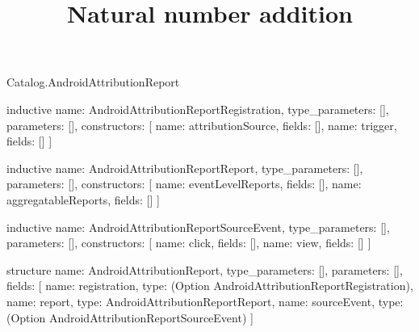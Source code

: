 \begin{lexlean}{Catalog.AndroidAttributionReport}
\title{Natural number addition}
\begin{semanticmodule}
inductive{
  name: AndroidAttributionReportRegistration,
  type_parameters: [],
  parameters: [],
  constructors: [
    {name: attributionSource, fields: []},
    {name: trigger, fields: []}
  ]
}

inductive{
  name: AndroidAttributionReportReport,
  type_parameters: [],
  parameters: [],
  constructors: [
    {name: eventLevelReports, fields: []},
    {name: aggregatableReports, fields: []}
  ]
}

inductive{
  name: AndroidAttributionReportSourceEvent,
  type_parameters: [],
  parameters: [],
  constructors: [
    {name: click, fields: []},
    {name: view, fields: []}
  ]
}

structure{
  name: AndroidAttributionReport,
  type_parameters: [],
  parameters: [],
  fields: [
    {name: registration, type: (Option AndroidAttributionReportRegistration)},
    {name: report, type: AndroidAttributionReportReport},
    {name: sourceEvent, type: (Option AndroidAttributionReportSourceEvent)}
  ]
}
\end{semanticmodule}
\end{lexlean}
